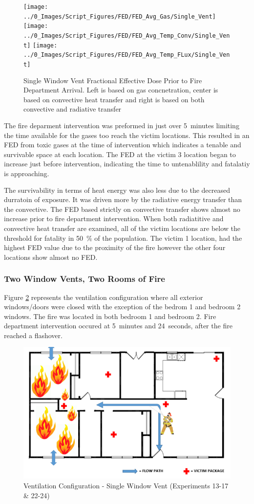 \documentclass[12pt,oneside]{book}
\begin{document}
\begin{figure}[H]
	\centering
	\texttt{[image: ../0\_Images/Script\_Figures/FED/FED\_Avg\_Gas/Single\_Vent]}
	\texttt{[image: ../0\_Images/Script\_Figures/FED/FED\_Avg\_Temp\_Conv/Single\_Vent]} 
	\texttt{[image: ../0\_Images/Script\_Figures/FED/FED\_Avg\_Temp\_FLux/Single\_Vent]}
	\caption[Single Window Vent Fractional Effective Dose]{Single Window Vent Fractional Effective Dose Prior to Fire Department Arrival. Left is based on gas concnetration, center is based on convective heat transfer and right is based on both convective and radiative transfer}
	\label{fig:FED_SingleVent}
\end{figure}

The fire deparment intervention was preformed in just over 5~minutes limiting the time available for the gases too reach the victim locations. This resulted in an FED from toxic gases at the time of intervention which indicates a tenable and survivable space at each location. The FED at the victim 3 location began to increase just before intervention, indicating the time to untenablility and fatalatiy is approaching. 

The survivability in terms of heat energy was also less due to the decreased durratoin of exposure. It was driven more by the radiative energy transfer than the convective. The FED based strictly on convective transfer shows almost no increase prior to fire department intervention. When both radiatitive and convective heat transfer are examined, all of the victim locations are below the threshold for fatality in 50~\% of the population. The victim 1 location, had the highest FED value due to the proximity of the fire however the other four locations show almost no FED. 

\subsubsection{Two Window Vents, Two Rooms of Fire}

Figure \ref{fig:Vent_Profile-Two_Vent} represents the ventilation configuration where all exterior windows/doors were closed with the exception of the bedrom 1 and bedroom 2 windows. The fire was located in both bedroom 1 and bedroom 2. Fire department intervention occured at 5~minutes and 24~seconds, after the fire reached a flashover. 

\begin{figure}[H]
	\centering
	\includegraphics[width=.65\textwidth]{../0_Images/Ventilation_Configurations/Two_Vent.png}
	\caption{Ventilation Configuration - Single Window Vent (Experiments 13-17 \& 22-24)}
	\label{fig:Vent_Profile-Two_Vent}
\end{figure}
\end{document}
